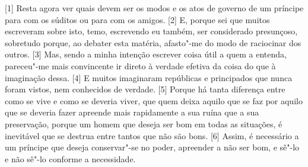{[}1{]} Resta agora ver quais devem ser os modos e os atos de governo de
um príncipe para com os súditos ou para com os amigos. {[}2{]} E, porque
sei que muitos escreveram sobre isto, temo, escrevendo eu também, ser considerado
presunçoso, sobretudo porque, ao debater esta matéria, afasto"-me do modo
de raciocinar dos outros. {[}3{]} Mas, sendo a minha intenção escrever
coisa útil a quem a entenda, pareceu"-me mais convincente ir direto à
verdade efetiva da coisa do que à imaginação dessa. {[}4{]} E muitos imaginaram
repúblicas e principados que nunca foram vistos, nem conhecidos de
verdade. {[}5{]} Porque há tanta diferença entre como se vive e como se
deveria viver, que quem deixa aquilo que se faz por aquilo que se
deveria fazer apreende mais rapidamente a sua ruína que a sua
preservação, porque um homem que deseja ser bom em todas as situações, é
inevitável que se destrua entre tantos que não são bons. {[}6{]} Assim,
é necessário a um príncipe que deseja conservar"-se no poder, apreender a
não ser bom, e sê"-lo e não sê"-lo conforme a necessidade.

